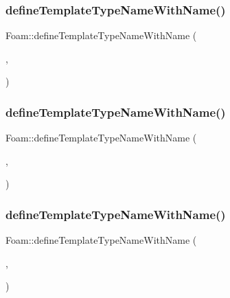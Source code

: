 \subsubsection{\texorpdfstring{define\+Template\+Type\+Name\+With\+Name()}{defineTemplateTypeNameWithName()}\hspace{0.1cm}{\footnotesize\ttfamily [7/13]}}
{\footnotesize\ttfamily Foam\+::define\+Template\+Type\+Name\+With\+Name (\begin{DoxyParamCaption}\item[{\hyperlink{classFoam_1_1registeredObject}{registered\+Object}$<$ spherical\+Tensor $>$}]{,  }\item[{\char`\"{}reg\+Spherical\+Tensor\char`\"{}}]{ }\end{DoxyParamCaption})}

\mbox{\label{namespaceFoam_a0a66c7d2a1d438b5e1688a110f674aaa}} 
\subsubsection{\texorpdfstring{define\+Template\+Type\+Name\+With\+Name()}{defineTemplateTypeNameWithName()}\hspace{0.1cm}{\footnotesize\ttfamily [8/13]}}
{\footnotesize\ttfamily Foam\+::define\+Template\+Type\+Name\+With\+Name (\begin{DoxyParamCaption}\item[{\hyperlink{classFoam_1_1registeredObject}{registered\+Object}$<$ tensor $>$}]{,  }\item[{\char`\"{}reg\+Tensor\char`\"{}}]{ }\end{DoxyParamCaption})}

\mbox{\label{namespaceFoam_a7b6d39b089f807824b138214100530eb}} 
\subsubsection{\texorpdfstring{define\+Template\+Type\+Name\+With\+Name()}{defineTemplateTypeNameWithName()}\hspace{0.1cm}{\footnotesize\ttfamily [9/13]}}
{\footnotesize\ttfamily Foam\+::define\+Template\+Type\+Name\+With\+Name (\begin{DoxyParamCaption}\item[{\hyperlink{classFoam_1_1registeredObject}{registered\+Object}$<$ Field$<$ scalar $>$$>$}]{,  }\item[{\char`\"{}reg\+Scalar\+Field\char`\"{}}]{ }\end{DoxyParamCaption})}


